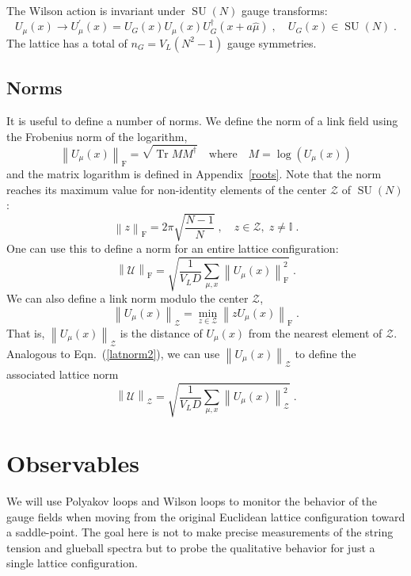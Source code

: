 \documentclass[preprint,aps,prd]{revtex4-2}
\newcommand{\da}{\dagger}  %
\newcommand{\be}{\begin{equation}}
\newcommand{\eq}{\end{equation}}
\newcommand{\zentrum}{\mathcal{Z}}       %
\newcommand{\config}{\mathcal{U}}
\DeclareMathOperator{\SU}{SU}
\DeclareMathOperator{\Tr}{Tr}
\newcommand\fnorm[1]{\left\lVert #1 \right\rVert_\mathrm{F}}
\begin{document}
The Wilson action is invariant under $\SU(N)$ gauge transforms:
%
\be
    U_\mu(x) \to U_\mu^\prime(x) = U_G(x) U_\mu(x) U_G^\da(x+a \hat{\mu})
         \; , \quad U_G(x) \in \SU(N) \; . \label{gauget}
\eq
%
The lattice has a total of $n_G = V_L\left(N^2-1\right)$ gauge symmetries.

\subsection{Norms}

It is useful to define a number of norms.  We define the norm
of a link field using the Frobenius norm of the logarithm,
%
\be
   \fnorm{U_\mu(x)} =
   \sqrt{\Tr M M^\dagger} \quad \mbox{where}
   \quad M = \log\left(U_\mu(x)\right)
   \label{sunorm}
\eq
and the matrix logarithm is defined in Appendix~\ref{roots}.
Note that the norm reaches its maximum value for non-identity
elements of the center $\zentrum$ of $\SU(N)$:
\be
    \fnorm{z} = 2\pi \sqrt{\frac{N-1}{N}} \; ,
     \quad z\in \zentrum,\; z\ne\mathbb{I} \; .
\eq
One can use this to define a norm for an entire
lattice configuration:
\be
   \fnorm{\config} =
   \sqrt{\frac{1}{V_L D} \sum_{\mu,x} \fnorm{U_\mu(x)}^2}
   \; . \label{latnorm2}
\eq
%
%
We can also define a link norm modulo the center $\zentrum$,
\be
\left\lVert U_\mu(x) \right\rVert_\zentrum =
    \min_{z\in \zentrum} \fnorm{z U_\mu(x)} \; .
\eq
That is, $\left\lVert U_\mu(x) \right\rVert_\zentrum$ is the distance
of $U_\mu(x)$ from the nearest element of $\zentrum$.
Analogous to Eqn.~(\ref{latnorm2}), we can
use $\left\lVert U_\mu(x) \right\rVert_\zentrum$ to define
the associated lattice norm
\be
    \left\lVert \config \right\rVert_\zentrum =
\sqrt{\frac{1}{V_L D} \sum_{\mu,x}
  \left\lVert U_\mu(x) \right\rVert_\zentrum^2}
   \; . \label{latnormz}
\eq

\section{Observables}

We will use Polyakov loops and Wilson loops to monitor the
behavior of the gauge fields when moving from
the original Euclidean lattice configuration toward
a saddle-point.  The goal here is not to make precise
measurements of the string tension and glueball spectra
but to probe the qualitative behavior for just a single
lattice configuration.
\end{document}
